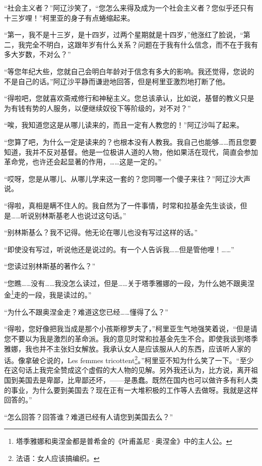 \par “社会主义者？”阿辽沙笑了，“您怎么来得及成为一个社会主义者？您似乎还只有十三岁哩！”柯里亚的身子有点蜷缩起来。
\par “第一，我不是十三岁，是十四岁，过两个星期就是十四岁，”他涨红了脸说，“第二，我完全不明白，这跟年岁有什么关系？问题在于我有什么信念，而不在于我有多大岁数，不对么？”
\par “等您年纪大些，您就自己会明白年龄对于信念有多大的影响。我还觉得，您说的不是自己的话。”阿辽沙平静而谦逊地回答，但是柯里亚激烈地打断了他。
\par “得啦吧，您就喜欢斋戒修行和神秘主义。您总该承认，比如说，基督的教义只是为有钱有势的人服务，以便继续奴役下等阶级的，对不对？”
\par “唉，我知道您这是从哪儿读来的，而且一定有人教您的！”阿辽沙叫了起来。
\par “您算了吧，为什么一定是读来的？也根本没有人教我。我自己也能够……而且您要知道，我并不反对基督。他是一位极讲人道的人物，他如果活在现代，简直会参加革命党，也许还会起显著的作用，……这是一定的。”
\par “哎呀，您是从哪儿、从哪儿学来这一套的？您同哪一个傻子来往？”阿辽沙大声说。
\par “得啦，真相是瞒不住人的。我自然为了一件事情，时常和拉基金先生谈谈，但是……听说别林斯基老人也说过这句话。”
\par “别林斯基么？我不记得。他无论在哪儿也没有写过这样的话。”
\par “即使没有写过，听说他还是说过的。有一个人告诉我……但是管他哩！……”
\par “您读过别林斯基的著作么？”
\par “您瞧……没有……我没怎么读过，但是……关于塔季雅娜的一段，为什么她不跟奥涅金\footnote{ 塔季雅娜和奥涅金都是普希金的《叶甫盖尼·奥涅金》中的主人公。}走的一段，我是读过的。”
\par “为什么不跟奥涅金走？难道这您已经……懂得了么？”
\par “得啦，您好像把我当成是那个小孩斯穆罗夫了，”柯里亚生气地强笑着说，“但是请您不要以为我是激烈的革命派。我的意见时常和拉基金先生不合。即使我谈到塔季雅娜，我也并不主张妇女解放。我承认女人是应该服从人的东西，应该听人家的话。像拿破仑说的，Les femmes tricottent\footnote{法语：女人应该搞编织。}。”柯里亚不知为什么笑了一下。“至少在这句话上我完全赞成这个虚假的大人物的见解。另外我还认为，比方说，离开祖国到美国去是卑鄙，比卑鄙还坏，——是愚蠢。既然在国内也可以做许多有利人类的事业，为什么要到美国去？现在正有一大堆积极的工作等人去做呀。我就是这样回答的。”
\par “怎么回答？回答谁？难道已经有人请您到美国去么？”
